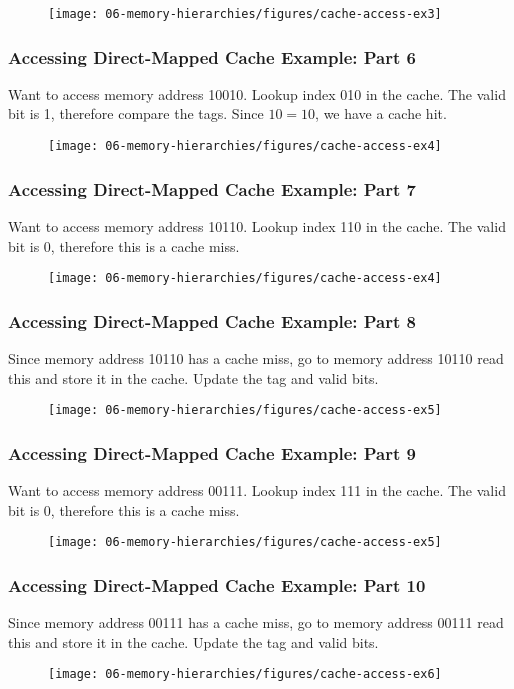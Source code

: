 {\begin{frame}
\begin{figure}[H]
\centering
{\texttt{[image: 06-memory-hierarchies/figures/cache-access-ex3]}}
\end{figure}
\end{frame}
\begin{frame}\frametitle{Accessing Direct-Mapped Cache Example: Part 6}
Want to access memory address 10010. Lookup index 010 in the cache. The valid bit is 1, therefore compare the tags. Since $10=10$, we have a cache hit.
\begin{figure}[H]
\centering
{\texttt{[image: 06-memory-hierarchies/figures/cache-access-ex4]}}
\end{figure}
\end{frame}
\newpage
\begin{frame}\frametitle{Accessing Direct-Mapped Cache Example: Part 7}
Want to access memory address 10110. Lookup index 110 in the cache. The valid bit is 0, therefore this is a cache miss.

\begin{figure}[H]
\centering
{\texttt{[image: 06-memory-hierarchies/figures/cache-access-ex4]}}
\end{figure}
\end{frame}
\begin{frame}\frametitle{Accessing Direct-Mapped Cache Example: Part 8}
Since memory address 10110 has a cache miss, go to memory address 10110 read this and store it in the cache. Update the tag and valid bits.
\begin{figure}[H]
\centering
{\texttt{[image: 06-memory-hierarchies/figures/cache-access-ex5]}}
\end{figure}
\end{frame}

\newpage
\begin{frame}\frametitle{Accessing Direct-Mapped Cache Example: Part 9}
Want to access memory address 00111. Lookup index 111 in the cache. The valid bit is 0, therefore this is a cache miss.
\begin{figure}[H]
\centering
{\texttt{[image: 06-memory-hierarchies/figures/cache-access-ex5]}}
\end{figure}

\end{frame}
\begin{frame}\frametitle{Accessing Direct-Mapped Cache Example: Part 10}
Since memory address 00111 has a cache miss, go to memory address 00111 read this and store it in the cache. Update the tag and valid bits.
\begin{figure}[H]
\centering
{\texttt{[image: 06-memory-hierarchies/figures/cache-access-ex6]}}
\end{figure}


\end{frame}}
